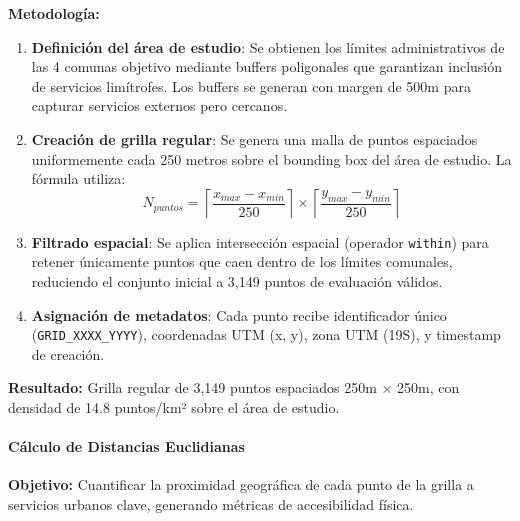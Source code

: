 \textbf{Metodología:}
\begin{enumerate}
    \item \textbf{Definición del área de estudio}: Se obtienen los límites administrativos de las 4 comunas objetivo mediante buffers poligonales que garantizan inclusión de servicios limítrofes. Los buffers se generan con margen de 500m para capturar servicios externos pero cercanos.
    
    \item \textbf{Creación de grilla regular}: Se genera una malla de puntos espaciados uniformemente cada 250 metros sobre el bounding box del área de estudio. La fórmula utiliza:
    \begin{equation}
    N_{puntos} = \left\lceil \frac{x_{max} - x_{min}}{250} \right\rceil \times \left\lceil \frac{y_{max} - y_{min}}{250} \right\rceil
    \end{equation}
    
    \item \textbf{Filtrado espacial}: Se aplica intersección espacial (operador \texttt{within}) para retener únicamente puntos que caen dentro de los límites comunales, reduciendo el conjunto inicial a 3,149 puntos de evaluación válidos.
    
    \item \textbf{Asignación de metadatos}: Cada punto recibe identificador único (\texttt{GRID\_XXXX\_YYYY}), coordenadas UTM (x, y), zona UTM (19S), y timestamp de creación.
\end{enumerate}

\textbf{Resultado:} Grilla regular de 3,149 puntos espaciados 250m × 250m, con densidad de 14.8 puntos/km² sobre el área de estudio.

\paragraph{Cálculo de Distancias Euclidianas}

\textbf{Objetivo:} Cuantificar la proximidad geográfica de cada punto de la grilla a servicios urbanos clave, generando métricas de accesibilidad física.

